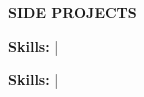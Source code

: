 %
%
%
%
%



\vspace{\spaceBeforeSection}
\textbf{SIDE PROJECTS} \hrulefill
\vspace{\spaceAfterSection}

\sideProjA \hfill \sideProjADate 

\begin{small}
\textbf{Skills: \sideProjASkills} | \sideProjAFor
\end{small}

\medskip 

\sideProjB \hfill \sideProjBDate

\begin{small}
\textbf{Skills: \sideProjBSkills} | \sideProjBFor
\end{small}
